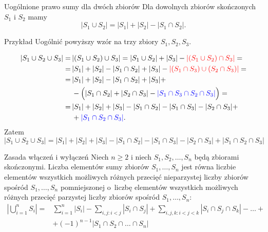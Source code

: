 \documentclass[a4paper,10pt]{beamer}
\begin{document}
\begin{frame}	

	\begin{block}{Uogólnione prawo sumy dla dwóch zbiorów}
		Dla dowolnych zbiorów skończonych $S_1$ i $S_2$ mamy
		$$|S_1\cup S_2|=|S_1|+|S_2|-|S_1\cap S_2|.$$
	\end{block}

	\begin{exampleblock}{Przykład}
		Uogólnić powyższy wzór na trzy zbiory $S_1,S_2,S_3$.
		
		\begin{align*}
			|S_1\cup S_2\cup S_3|=&\,|(S_1\cup S_2)\cup S_3|=|S_1\cup S_2|+|S_3|-\textcolor{red}{|(S_1\cup S_2)\cap S_3|}=\\	
			=&\,|S_1|+|S_2|-|S_1\cap S_2|+|S_3|-\textcolor{red}{|(S_1\cap S_3)\cup(S_2\cap S_3)|}=\\	
			=&\,|S_1|+|S_2|-|S_1\cap S_2|+|S_3|+\\
			&\,-\Big(|S_1\cap S_2|+|S_2\cap S_3|-\textcolor{blue}{|S_1\cap S_3\cap S_2\cap S_3|}\Big)=\\
			=&\,|S_1|+|S_2|+|S_3|-|S_1\cap S_2|-|S_1\cap S_3|-|S_2\cap S_3|+\\
			&\,+\textcolor{blue}{|S_1\cap S_2\cap S_3|}.
		\end{align*}
		Zatem
			$$|S_1\cup S_2\cup S_3|=|S_1|+|S_2|+|S_3|-|S_1\cap S_2|-|S_1\cap S_3|-|S_2\cap S_3|+|S_1\cap S_2\cap S_3|$$
	\end{exampleblock}
	
\end{frame}



\begin{frame}
	
	\begin{block}{Zasada włączeń i wyłączeń}
		Niech $n\geq2$ i niech $S_1,S_2,\ldots,S_n$ będą zbiorami skończonymi. Liczba elementów sumy zbiorów $S_1,\ldots,S_n$ jest równa liczbie elementów wszystkich możliwych różnych przecięć nieparzystej liczby zbiorów spośród $S_1,\ldots,S_n$ pomniejszonej o~liczbę elementów wszystkich możliwych różnych przecięć parzystej liczby zbiorów spośród $S_1,\ldots,S_n$:
		\begin{align*}\left|\bigcup\limits_{i=1}^nS_i\right|=&\sum\limits_{i=1}^n|S_i|-\sum_{i,j:i<j}|S_i\cap S_j|+\sum_{i,j,k:i<j<k}|S_i\cap S_j\cap S_k|-\ldots+\\
		&+(-1)^{n-1}|S_1\cap S_2\cap\ldots\cap S_n|
		\end{align*}
	\end{block}

\end{frame}
\end{document}
